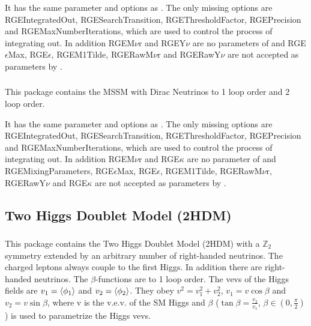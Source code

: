 \documentclass[10pt,a4paper,twoside]{scrartcl}
\begin{document}
\vspace{2ex} It has the same parameter and options as .  The
only missing options are RGEIntegratedOut, RGESearchTransition,
RGEThresholdFactor, RGEPrecision and RGEMaxNumberIterations, which are used to
control the process of integrating out.  In addition RGEM$\nu$r and RGEY$\nu$
are no parameters of  and RGE$\epsilon$Max,
RGE$\epsilon$, RGEM1Tilde, RGERawM$\nu$r and RGERawY$\nu$
are not accepted as parameters by .


\subsubsection[\package{RGEMSSMDirac}]{}
This package contains the MSSM with Dirac Neutrinos to 1 loop order and 2 loop
order.

\vspace{2ex} It has the same parameter and options as .  The
only missing options are RGEIntegratedOut, RGESearchTransition,
RGEThresholdFactor, RGEPrecision and RGEMaxNumberIterations, which are used to
control the process of integrating out.  In addition RGEM$\nu$r and RGE$\kappa$
are no parameter of  and RGEMixingParameters, RGE$\epsilon$Max,
RGE$\epsilon$, RGEM1Tilde, RGERawM$\nu$r, RGERawY$\nu$ and
RGE$\kappa$ are not accepted as parameters by .

\subsection{Two Higgs Doublet Model (2HDM)}

\subsubsection[\package{RGE2HDM}]{}
This package contains the Two Higgs Doublet Model (2HDM) with a $\mathbb{Z}_2$
symmetry extended by an arbitrary number of right-handed neutrinos. The charged leptons always couple to the first Higgs. In addition
there are right-handed neutrinos. The $\beta$-functions are to 1 loop order. The
vevs of the Higgs fields are $v_1=\braket{\phi_1}$ and
$v_2=\braket{\phi_2}$. They obey $v^2=v_1^2+v_2^2$, $v_1=v\cos\beta$ and
$v_2=v\sin\beta$, where v is the v.e.v. of the SM Higgs and $\beta$
($\tan\beta=\frac{v_2}{v_1}$, $\beta\in\left(0,\frac{\pi}{2}\right)$) is used to
parametrize the Higgs vevs.
\end{document}
